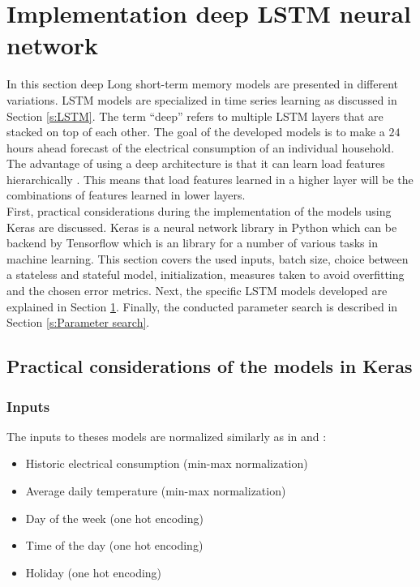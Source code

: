 \section{Implementation deep LSTM neural network}\label{s:Implementation deep LSTM neural network}
In this section deep Long short-term memory models are presented in different variations. LSTM models are specialized in time series learning as discussed in Section \ref{s:LSTM}. The term ``deep'' refers to multiple LSTM layers that are stacked on top of each other. The goal of the developed models is to make a $ 24 $ hours ahead forecast of the electrical consumption of an individual household. The advantage of using a deep architecture is that it can learn load features hierarchically \cite{Shi2018}. This means that load features learned in a higher layer will be the combinations of features learned in lower layers.\\
First, practical considerations during the implementation of the models using Keras are discussed. Keras is a neural network library in Python which can be backend by Tensorflow which is an library for a number of various tasks in machine learning. This section covers the used inputs, batch size, choice between a stateless and stateful model, initialization, measures taken to avoid overfitting and the chosen error metrics. Next, the specific LSTM models developed are explained in Section \ref{s:Implementation deep LSTM neural network}. Finally, the conducted parameter search is described in Section \ref{s:Parameter search}.

\subsection{Practical considerations of the models in Keras}

\subsubsection{Inputs}\label{s:Inputs}
The inputs to theses models are normalized similarly as in \cite{loadforecastingmoor} and \cite{Kong2019}: 

\begin{itemize}
	\item Historic electrical consumption (min-max normalization)
	\item Average daily temperature (min-max normalization)
	\item Day of the week (one hot encoding)
	\item Time of the day (one hot encoding)
	\item Holiday (one hot encoding)
\end{itemize}

